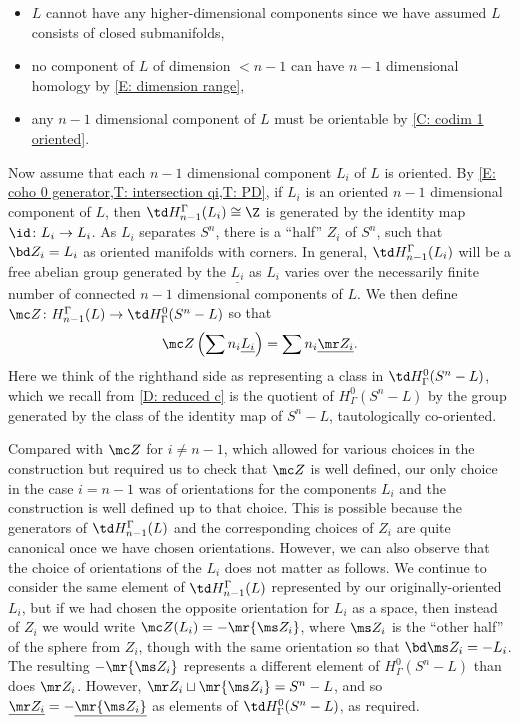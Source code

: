 \begin{example}
\begin{itemize}
	\item $L$ cannot have any higher-dimensional components since we have assumed $L$ consists of closed submanifolds,

	\item no component of $L$ of dimension $<n-1$ can have $n-1$ dimensional homology by \cref{E: dimension range},

	\item any $n-1$ dimensional component of $L$ must be orientable by \cref{C: codim 1 oriented}.
\end{itemize}

Now assume that each $n-1$ dimensional component $L_i$ of $L$ is oriented.
By \cref{E: coho 0 generator,T: intersection qi,T: PD}, if $L_i$ is an oriented $n-1$ dimensional component of $L$, then $\td H_{n-1}^\Gamma(L_i) \cong \Z$ is generated by the identity map $\id \colon L_i \to L_i$.
As $L_i$ separates $S^n$, there is a ``half'' $Z_i$ of $S^n$, such that $\bd Z_i = L_i$ as oriented manifolds with corners.
In general, $\td H_{n-1}^\Gamma(L_i)$ will be a free abelian group generated by the $\underline{L_i}$ as $L_i$ varies over the necessarily finite number of connected $n-1$ dimensional components of $L$.
We then define $\mc Z \colon H_{n-1}^\Gamma(L) \to \td H^{0}_\Gamma(S^n-L)$ so that $$\mc Z \left(\sum n_i \underline{L_i}\right) = \sum n_i \underline{\mr Z_i}.$$
Here we think of the righthand side as representing a class in $\td H^{0}_\Gamma(S^n-L)$, which we recall from \cref{D: reduced c} is the quotient of $H^{0}_\Gamma(S^n-L)$ by the group generated by the class of the identity map of $S^n-L$, tautologically co-oriented.

Compared with $\mc Z$ for $i \neq n-1$, which allowed for various choices in the construction but required us to check that $\mc Z$ is well defined, our only choice in the case $i = n-1$ was of orientations for the components $L_i$ and the construction is well defined up to that choice.
This is possible because the generators of $\td H_{n-1}^\Gamma(L)$ and the corresponding choices of $Z_i$ are quite canonical once we have chosen orientations.
However, we can also observe that the choice of orientations of the $L_i$ does not matter as follows.
We continue to consider the same element of $\td H_{n-1}^\Gamma(L)$ represented by our originally-oriented $L_i$, but if we had chosen the opposite orientation for $L_i$ as a space, then instead of $Z_i$ we would write $\mc Z(L_i) = -\mr{\ms Z_i}$, where $\ms Z_i$ is the ``other half'' of the sphere from $Z_i$, though with the same orientation so that $\bd \ms Z_i = -L_i$.
The resulting $-\mr {\ms Z_i}$ represents a different element of $H^{0}_\Gamma(S^n-L)$ than does $\mr Z_i$.
However, $\mr Z_i \sqcup \mr{\ms Z_i} = S^n-L$, and so $\underline {\mr Z_i} = -\underline{\mr {\ms Z_i}}$ as elements of $\td H^0_\Gamma(S^n - L)$, as required.



\end{example}
